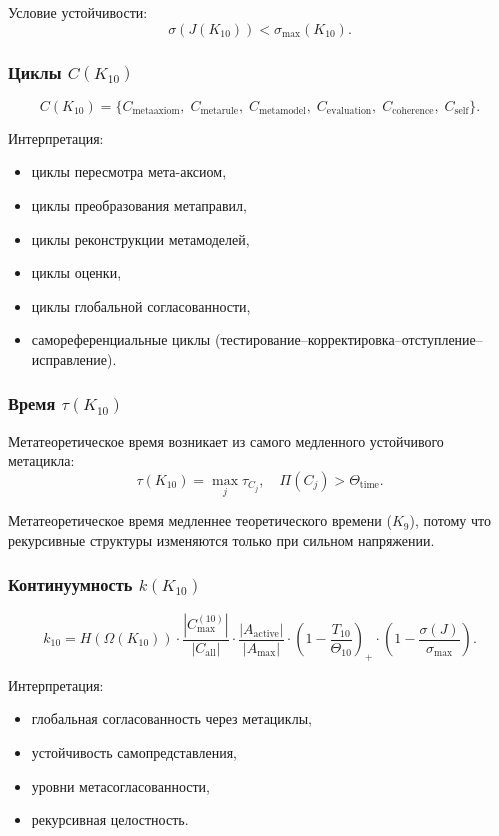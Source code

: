 Условие устойчивости:
\[
\sigma(J(K_{10})) < \sigma_{\max}(K_{10}).
\]

\subsubsection{Циклы $C(K_{10})$}

\[
C(K_{10})=
\{
C_{\mathrm{metaaxiom}},\;
C_{\mathrm{metarule}},\;
C_{\mathrm{metamodel}},\;
C_{\mathrm{evaluation}},\;
C_{\mathrm{coherence}},\;
C_{\mathrm{self}}
\}.
\]

Интерпретация:
\begin{itemize}
    \item циклы пересмотра мета-аксиом,
    \item циклы преобразования метаправил,
    \item циклы реконструкции метамоделей,
    \item циклы оценки,
    \item циклы глобальной согласованности,
    \item самореференциальные циклы (тестирование–корректировка–отступление–исправление).
\end{itemize}

\subsubsection{Время $\tau(K_{10})$}

Метатеоретическое время возникает из самого медленного устойчивого метацикла:
\[
\tau(K_{10}) = \max_j \tau_{C_j},
\quad
\Pi(C_j) > \Theta_{\mathrm{time}}.
\]

Метатеоретическое время медленнее теоретического времени ($K_9$), потому что рекурсивные структуры изменяются только при сильном напряжении.

\subsubsection{Континуумность $k(K_{10})$}

\[
k_{10} =
H(\Omega(K_{10}))
\cdot
\frac{|C_{\max}^{(10)}|}{|C_{\mathrm{all}}|}
\cdot
\frac{|A_{\mathrm{active}}|}{|A_{\max}|}
\cdot
\left(1-\frac{T_{10}}{\Theta_{10}}\right)_+
\cdot
\left(1-\frac{\sigma(J)}{\sigma_{\max}}\right).
\]

Интерпретация:
\begin{itemize}
    \item глобальная согласованность через метациклы,
    \item устойчивость самопредставления,
    \item уровни метасогласованности,
    \item рекурсивная целостность.
\end{itemize}

